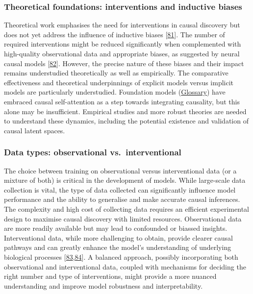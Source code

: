 \hypertarget{theoretical-foundations-interventions-and-inductive-biases}{%
\subsubsection{Theoretical foundations: interventions and inductive biases}\label{theoretical-foundations-interventions-and-inductive-biases}}

Theoretical work emphasises the need for interventions in causal discovery but does not yet address the influence of inductive biases {[}\protect\hyperlink{ref-S1VP202R}{81}{]}.
The number of required interventions might be reduced significantly when complemented with high-quality observational data and appropriate biases, as suggested by neural causal models {[}\protect\hyperlink{ref-7HxYpmt4}{82}{]}.
However, the precise nature of these biases and their impact remains understudied theoretically as well as empirically.
The comparative effectiveness and theoretical underpinnings of explicit models versus implicit models are particularly understudied.
Foundation models (\protect\hyperlink{foundation-model}{Glossary}) have embraced causal self-attention as a step towards integrating causality, but this alone may be insufficient.
Empirical studies and more robust theories are needed to understand these dynamics, including the potential existence and validation of causal latent spaces.

\hypertarget{data-types-observational-vs.-interventional}{%
\subsubsection{Data types: observational vs.~interventional}\label{data-types-observational-vs.-interventional}}

The choice between training on observational versus interventional data (or a mixture of both) is critical in the development of models.
While large-scale data collection is vital, the type of data collected can significantly influence model performance and the ability to generalise and make accurate causal inferences.
The complexity and high cost of collecting data requires an efficient experimental design to maximise causal discovery with limited resources.
Observational data are more readily available but may lead to confounded or biassed insights.
Interventional data, while more challenging to obtain, provide clearer causal pathways and can greatly enhance the model's understanding of underlying biological processes {[}\protect\hyperlink{ref-3MP7gokd}{83},\protect\hyperlink{ref-zXrfFfft}{84}{]}.
A balanced approach, possibly incorporating both observational and interventional data, coupled with mechanisms for deciding the right number and type of interventions, might provide a more nuanced understanding and improve model robustness and interpretability.

